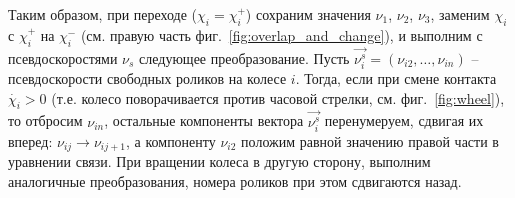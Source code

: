 Таким образом, при переходе ($\chi_i = \chi_i^+$) сохраним значения $\nu_1$, $\nu_2$, $\nu_3$, заменим $\chi_i$ с $\chi_i^+$ на $\chi_i^-$ (см. правую часть фиг.~\ref{fig:overlap_and_change}), и выполним с псевдоскоростями $\nu_s$ следующее преобразование. Пусть $\vec{\nu_i^s} = (\nu_{i2},\ldots,\nu_{in})$ -- псевдоскорости свободных роликов на колесе $i$. Тогда, если при смене контакта $\dot{\chi_i} > 0$ (т.е. колесо поворачивается против часовой стрелки, см. фиг.~\ref{fig:wheel}), то отбросим $\nu_{in}$, остальные компоненты вектора $\vec{\nu_i^s}$ перенумеруем, сдвигая их вперед: $\nu_{ij} \rightarrow \nu_{ij+1}$, а компоненту $\nu_{i2}$ положим равной значению правой части в уравнении связи. При вращении колеса в другую сторону, выполним аналогичные преобразования, номера роликов при этом сдвигаются назад.
